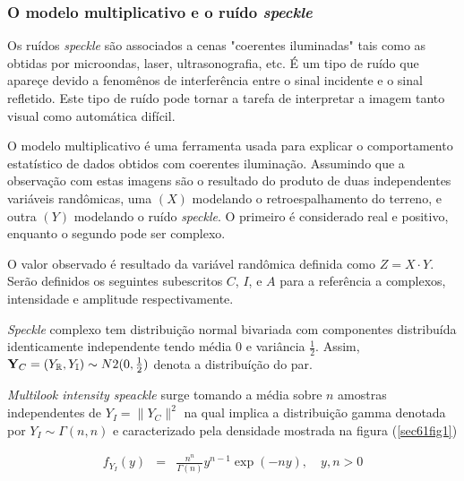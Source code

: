 \documentclass[10pt,a4paper]{article}
\begin{document}
\subsubsection{O modelo multiplicativo e o ruído {\it speckle}}

Os ruídos {\it speckle} são associados a cenas "coerentes iluminadas" tais como as obtidas por microondas, laser, ultrasonografia, etc. É um tipo de ruído que apareçe devido a fenomênos de interferência entre o sinal incidente e o sinal refletido. Este tipo de ruído pode tornar a tarefa de interpretar a imagem tanto visual como automática difícil. 

O modelo multiplicativo é uma ferramenta usada para explicar o comportamento estatístico de dados obtidos com coerentes iluminação. Assumindo que a observação com estas imagens são o resultado do produto de duas independentes variáveis randômicas, uma $(X)$ modelando o retroespalhamento do terreno, e outra $(Y)$ modelando o ruído {\it speckle}. O primeiro é considerado real e positivo, enquanto o segundo pode ser complexo.

O valor observado é resultado da variável randômica definida como $Z=X\cdot Y$. Serão definidos os seguintes subescritos $C$, $I$, e $A$ para a referência a complexos, intensidade e amplitude respectivamente.

{\it Speckle} complexo tem distribuição normal bivariada com componentes distribuída identicamente independente tendo média $0$ e variância $\frac{1}{2}$. Assim, ${\bf Y}_{C}=(Y_{\mathbb{R}}, Y_{\mathbb{I}})\sim N2(0,\frac{1}{2})$ denota a distribuíção do par.

{\it Multilook intensity speackle} surge tomando a média sobre $n$ amostras independentes de $Y_{I}=\|Y_{C}\|^2$ na qual implica a distribuição gamma denotada por $Y_{I}\sim \Gamma(n,n)$ e caracterizado pela densidade mostrada na figura (\ref{sec61fig1})

\begin{equation}\label{sec61eqn1}
\begin{array}{ccc}
	f_{Y_{I}}(y)&=&\frac{n^{n}}{\Gamma(n)}y^{n-1}\exp\left(-ny\right),\quad y,n>0 \\
\end{array}
\end{equation}
\end{document}
